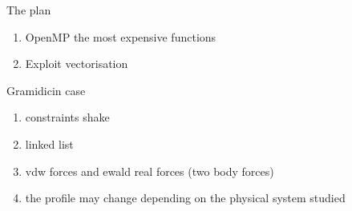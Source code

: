 \begin{frame}{The plan}
\begin{enumerate}
\item OpenMP the most expensive functions
\item Exploit vectorisation
\end{enumerate}
\pause
Gramidicin case
\begin{enumerate}
\item constraints shake
\item linked list
\item vdw forces and ewald real forces (two body forces)
\item the profile may change depending on the physical system studied
\end{enumerate}
\end{frame}

